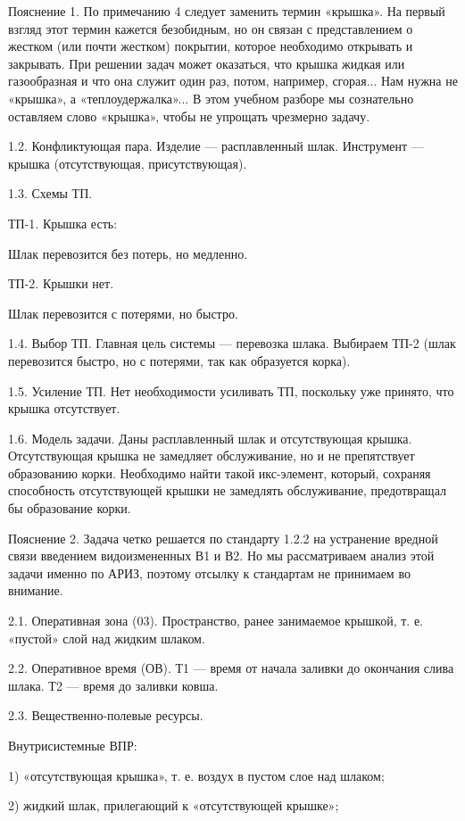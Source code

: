 Пояснение  1.  По  примечанию  4  следует  заменить  термин  «крышка».
На  первый  взгляд  этот  термин  кажется  безобидным,  но  он  связан
с  представлением  о жестком  (или  почти  жестком) покрытии,  которое
необходимо открывать  и закрывать. При решении  задач может оказаться,
что крышка жидкая  или газообразная и что она служит  один раз, потом,
например,  сгорая... Нам  нужна не  «крышка», а  «теплоудержалка»... В
этом учебном разборе мы сознательно оставляем слово «крышка», чтобы не
упрощать чрезмерно задачу.

1.2. Конфликтующая  пара. Изделие  — расплавленный шлак.  Инструмент —
крышка (отсутствующая, присутствующая).


1.3. Схемы ТП.

ТП-1. Крышка есть:

Шлак перевозится без потерь, но медленно.

ТП-2. Крышки нет.

Шлак перевозится с потерями, но быстро.


1.4. Выбор ТП.  Главная цель системы — перевозка  шлака. Выбираем ТП-2
(шлак перевозится быстро, но с потерями, так как образуется корка).

1.5.  Усиление  ТП.  Нет  необходимости усиливать  ТП,  поскольку  уже
принято, что крышка отсутствует.

1.6. Модель  задачи. Даны  расплавленный шлак и  отсутствующая крышка.
Отсутствующая крышка  не замедляет обслуживание, но  и не препятствует
образованию  корки.  Необходимо   найти  такой  икс-элемент,  который,
сохраняя способность  отсутствующей крышки не  замедлять обслуживание,
предотвращал бы образование корки.

Пояснение 2.  Задача четко решается  по стандарту 1.2.2  на устранение
вредной связи  введением видоизмененных В1  и В2. Но  мы рассматриваем
анализ этой  задачи именно  по АРИЗ, поэтому  отсылку к  стандартам не
принимаем во внимание.

2.1. Оперативная зона (03). Пространство, ранее занимаемое крышкой, т.
е. «пустой» слой над жидким шлаком.

2.2. Оперативное время (ОВ). Т1 — время от начала заливки до окончания
слива шлака. Т2 — время до заливки ковша.

2.3. Вещественно-полевые ресурсы.

Внутрисистемные ВПР:

1) «отсутствующая крышка», т. е. воздух в пустом слое над шлаком;

2) жидкий шлак, прилегающий к «отсутствующей крышке»;

